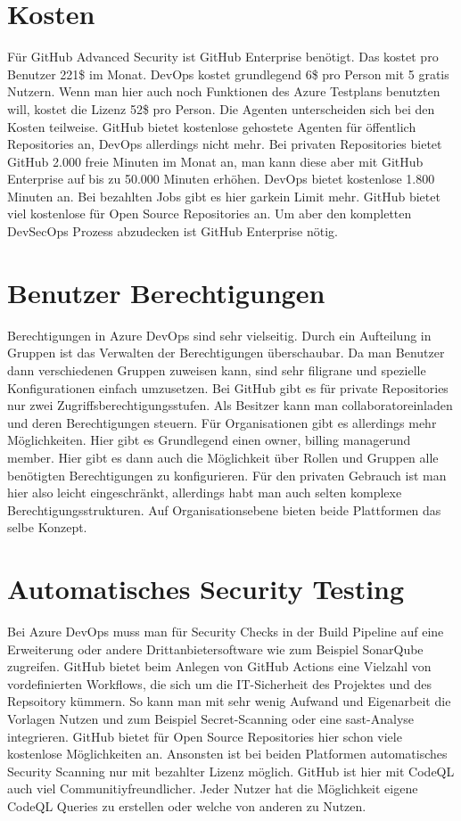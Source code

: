 \section{Kosten}
Für GitHub Advanced Security ist GitHub Enterprise benötigt. Das kostet pro Benutzer 221\$ im Monat. DevOps kostet grundlegend 6\$ pro Person mit 5 gratis Nutzern. Wenn man hier auch noch Funktionen des Azure Testplans benutzten will, kostet die Lizenz 52\$ pro Person.
Die Agenten unterscheiden sich bei den Kosten teilweise. GitHub bietet kostenlose gehostete Agenten für öffentlich Repositories an, DevOps allerdings nicht mehr. Bei privaten Repositories bietet GitHub 2.000 freie Minuten im Monat an, man kann diese aber mit GitHub Enterprise auf bis zu 50.000 Minuten erhöhen. DevOps bietet kostenlose 1.800 Minuten an. Bei bezahlten Jobs gibt es hier garkein Limit mehr. 
GitHub bietet viel kostenlose für Open Source Repositories an. Um aber den kompletten DevSecOps Prozess abzudecken ist GitHub Enterprise nötig.

\section{Benutzer Berechtigungen}
Berechtigungen in Azure DevOps sind sehr vielseitig. Durch ein Aufteilung in Gruppen ist das Verwalten der Berechtigungen überschaubar. Da man Benutzer dann verschiedenen Gruppen zuweisen kann, sind sehr filigrane und spezielle Konfigurationen einfach umzusetzen. \cite{KathrynEE_fd} Bei GitHub gibt es für private Repositories nur zwei Zugriffsberechtigungsstufen. Als Besitzer kann man \glqq collaborator\grqq\enspace  einladen und deren Berechtigungen steuern. Für Organisationen gibt es allerdings mehr Möglichkeiten. Hier gibt es Grundlegend einen \glqq owner\grqq , \glqq billing manager\grqq\enspace und \glqq member\grqq . Hier gibt es dann auch die Möglichkeit über Rollen und Gruppen alle benötigten Berechtigungen zu konfigurieren. \cite{github-permissions} Für den privaten Gebrauch ist man hier also leicht eingeschränkt, allerdings habt man auch selten komplexe Berechtigungsstrukturen. Auf Organisationsebene bieten beide Plattformen das selbe Konzept.

\section{Automatisches Security Testing}
Bei Azure DevOps muss man für Security Checks in der Build Pipeline auf eine Erweiterung oder andere Drittanbietersoftware wie zum Beispiel SonarQube zugreifen. GitHub bietet beim Anlegen von GitHub Actions eine Vielzahl von vordefinierten Workflows, die sich um die IT-Sicherheit des Projektes und des Repsoitory kümmern. So kann man mit sehr wenig Aufwand und Eigenarbeit die Vorlagen Nutzen und zum Beispiel Secret-Scanning oder eine \ac{sast}-Analyse integrieren. GitHub bietet für Open Source Repositories hier schon viele kostenlose Möglichkeiten an. Ansonsten ist bei beiden Platformen automatisches Security Scanning nur mit bezahlter Lizenz möglich. GitHub ist hier mit CodeQL auch viel Communitiyfreundlicher. Jeder Nutzer hat die Möglichkeit eigene CodeQL Queries zu erstellen oder welche von anderen zu Nutzen. \cite{Porta2021-vz}

